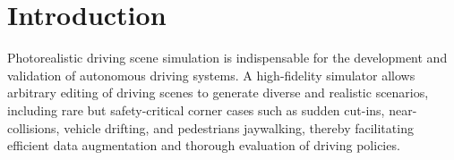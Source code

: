\documentclass[runningheads]{llncs}
\begin{document}
\section{Introduction}
\label{sec:intro}
Photorealistic driving scene simulation is indispensable for the development and validation of autonomous driving systems. A high-fidelity simulator allows arbitrary editing of driving scenes to generate diverse and realistic scenarios, including rare but safety-critical corner cases such as sudden cut-ins, near-collisions, vehicle drifting, and pedestrians jaywalking, thereby facilitating efficient data augmentation and thorough evaluation of driving policies.

\end{document}
